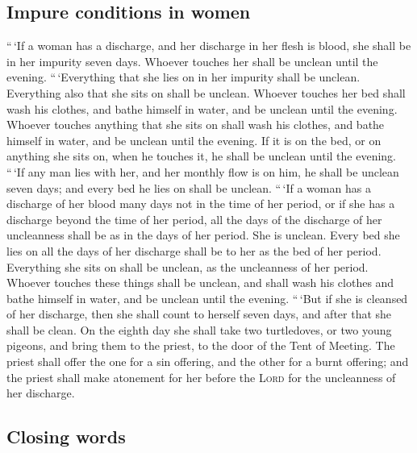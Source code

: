 \hypertarget{impure-conditions-in-women}{%
\subsection{Impure conditions in
women}\label{impure-conditions-in-women}}

 ``\,`If a woman has a discharge, and her discharge in
her flesh is blood, she shall be in her impurity seven days. Whoever
touches her shall be unclean until the evening. 
``\,`Everything that she lies on in her impurity shall be unclean.
Everything also that she sits on shall be unclean. 
Whoever touches her bed shall wash his clothes, and bathe himself in
water, and be unclean until the evening.  Whoever touches
anything that she sits on shall wash his clothes, and bathe himself in
water, and be unclean until the evening.  If it is on the
bed, or on anything she sits on, when he touches it, he shall be unclean
until the evening.  ``\,`If any man lies with her, and
her monthly flow is on him, he shall be unclean seven days; and every
bed he lies on shall be unclean.  ``\,`If a woman has a
discharge of her blood many days not in the time of her period, or if
she has a discharge beyond the time of her period, all the days of the
discharge of her uncleanness shall be as in the days of her period. She
is unclean.  Every bed she lies on all the days of her
discharge shall be to her as the bed of her period. Everything she sits
on shall be unclean, as the uncleanness of her period. 
Whoever touches these things shall be unclean, and shall wash his
clothes and bathe himself in water, and be unclean until the evening.
 ``\,`But if she is cleansed of her discharge, then she
shall count to herself seven days, and after that she shall be clean.
 On the eighth day she shall take two turtledoves, or two
young pigeons, and bring them to the priest, to the door of the Tent of
Meeting.  The priest shall offer the one for a sin
offering, and the other for a burnt offering; and the priest shall make
atonement for her before the \textsc{Lord} for the uncleanness of her
discharge.

\hypertarget{closing-words}{%
\subsection{Closing words}\label{closing-words}}

